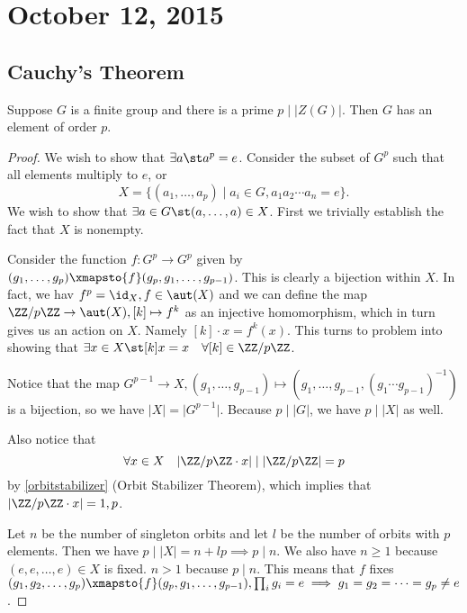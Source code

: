 \section{October 12, 2015}

\subsection{Cauchy's Theorem}

\begin{thm}[Cauchy]
Suppose $G$ is a finite group and there is a prime $p \mid \lvert Z(G)
\vert$. Then $G$ has an element of order $p$.
\end{thm}

\begin{proof}
We wish to show that $\exists a \st a^p = e$. Consider the subset of
$G^p$ such that all elements multiply to $e$, or
\[ X = \lbrace (a_1, \dots, a_p) \mid a_i \in G, a_1 a_2 \cdots a_n = e
\rbrace. \]
We wish to show that $\exists a \in G \st (a, \dots, a) \in X$. First we
trivially establish the fact that $X$ is nonempty.

Consider the function $f : G^p \to G^p$ given by $(g_1, \dots, g_p)
\xmapsto{f} (g_p, g_1, \dots, g_{p - 1})$. This is clearly a bijection
within $X$. In fact, we hav $f^p = \id_X, f \in \aut(X)$ and we can
define the map $\ZZ / p \ZZ \to \aut(X), [k] \mapsto f^k$ as an
injective homomorphism, which in turn gives us an action on $X$. Namely
$[k] \cdot x = f^k(x)$. This turns to problem into showing that $\exists
x \in X \st [k]x = x \quad \forall [k] \in \ZZ / p \ZZ$.

Notice that the map $G^{p - 1} \to X, (g_1, \dots, g_{p - 1}) \mapsto
(g_1, \dots, g_{p - 1}, (g_1 \cdots g_{p - 1})^{-1})$ is a bijection, so
we have $\lvert X \rvert = \lvert G^{p - 1} \rvert$. Because $p \mid
\lvert G \rvert$, we have $p \mid \lvert X \rvert$ as well.

Also notice that
\[ \forall x \in X \quad \lvert \ZZ / p \ZZ \cdot x \rvert \mid \lvert
\ZZ / p \ZZ \rvert = p \]
by \ref{orbitstabilizer} (Orbit Stabilizer Theorem), which implies that
$\lvert \ZZ / p \ZZ \cdot x \rvert = 1, p$.

Let $n$ be the number of singleton orbits and let $l$ be the number of
orbits with $p$ elements. Then we have $p \mid \lvert X \rvert = n + lp
\implies p \mid n$. We also have $n \geq 1$ because $(e, e, \dots, e)
\in X$ is fixed. $n > 1$ because $p \mid n$. This means that $f$ fixes
$(g_1, g_2, \dots, g_p) \xmapsto{f} (g_p, g_1, \dots, g_{p - 1}),
\prod_i g_i = e \implies g_1 = g_2 = \cdots = g_p \neq e$.
\end{proof}
